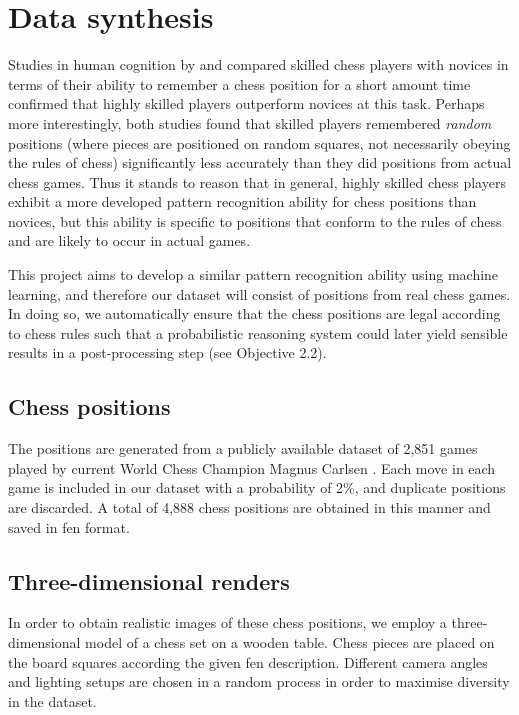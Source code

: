 \documentclass[../main.tex]{subfiles}
\begin{document}
\chapter{Data synthesis}

Studies in human cognition by \textcite{bilalic2010} and \textcite{zhou2018} compared skilled chess players with novices in terms of their ability to remember a chess position for a short amount time confirmed that highly skilled players outperform novices at this task.
Perhaps more interestingly, both studies found that skilled players remembered \emph{random} positions (where pieces are positioned on random squares, not necessarily obeying the rules of chess) significantly less accurately than they did positions from actual chess games. 
Thus it stands to reason that in general, highly skilled chess players exhibit a more developed pattern recognition ability for chess positions than novices, but this ability is specific to positions that conform to the rules of chess and are likely to occur in actual games.

This project aims to develop a similar pattern recognition ability using machine learning, and therefore our dataset will consist of positions from real chess games. 
In doing so, we automatically ensure that the chess positions are legal according to chess rules such that a probabilistic reasoning system could later yield sensible results in a post-processing step (see Objective 2.2).

\section{Chess positions}
The positions are generated from a publicly available dataset of 2,851 games played by current World Chess Champion Magnus Carlsen \cite{64squares2020}.
Each move in each game is included in our dataset with a probability of 2\%, and duplicate positions are discarded.
A total of 4,888 chess positions are obtained in this manner and saved in \gls{fen} format.

\section{Three-dimensional renders}
In order to obtain realistic images of these chess positions, we employ a three-dimensional model of a chess set on a wooden table. 
Chess pieces are placed on the board squares according the given \gls{fen} description. 
Different camera angles and lighting setups are chosen in a random process in order to maximise diversity in the dataset.
\end{document}

